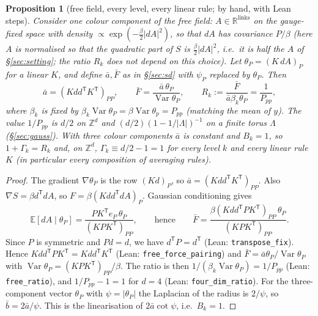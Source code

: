 \documentclass[11pt,a4paper]{article}
\newtheorem{proposition}[theorem]{Proposition}
\theoremstyle{definition}
\theoremstyle{remark}
\newcommand{\E}{\mathbb{E}}
\newcommand{\code}[1]{\texttt{#1}}
\newcommand{\abar}{\bar a}
\newcommand{\bbar}{\bar b}
\newcommand{\Fbar}{\bar F}
\begin{document}
\begin{proposition}[free field, every level, every linear rule; by hand, with Lean steps]\label{prop:free}
Consider one colour component of the free field: $A\in\mathbb R^{\text{links}}$ on the gauge-fixed space with density $\propto\exp(-\tfrac\beta2|dA|^2)$, so that $dA$ has covariance $P/\beta$ (here $A$ is normalised so that the quadratic part of $S$ is $\frac\beta2|dA|^2$, i.e.\ it is half the $A$ of \S\ref{sec:setting}; the ratio $R_k$ does not depend on this choice). Let $\theta_P=(K\,dA)_P$ for a linear $K$, and define $\abar,\Fbar$ as in \S\ref{sec:sd} with $\psi_P$ replaced by $\theta_P$. Then
\[
\abar=(Kdd^{\mathsf T}K^{\mathsf T})_{PP},\qquad \Fbar=\frac{\abar\,\theta_P}{\operatorname{Var}\theta_P},\qquad R_k:=\frac{\Fbar}{\abar\beta_k\theta_P}=\frac1{P_{pp}},
\]
where $\beta_k$ is fixed by $\beta_k\operatorname{Var}\theta_P=\beta\operatorname{Var}\theta_p=P_{pp}$ (matching the mean of $y$). The value $1/P_{pp}$ is $d/2$ on $\mathbb Z^d$ and $(d/2)(1-1/|\Lambda|)^{-1}$ on a finite torus $\Lambda$ (\S\ref{sec:gauss}). With three colour components $\abar$ is constant and $B_k=1$, so $1+\Gamma_k=R_k$ and, on $\mathbb Z^d$, $\Gamma_k\equiv d/2-1=1$ for every level $k$ and every linear rule $K$ (in particular every composition of averaging rules).
\end{proposition}

\begin{proof}
The gradient $\nabla\theta_P$ is the row $(Kd)_P$, so $\abar=(Kdd^{\mathsf T}K^{\mathsf T})_{PP}$. Also $\nabla S=\beta d^{\mathsf T}dA$, so $F=\beta(Kdd^{\mathsf T}dA)_P$. Gaussian conditioning gives
\[
\E[dA\mid\theta_P]=\frac{PK^{\mathsf T}e_P\,\theta_P}{(KPK^{\mathsf T})_{PP}},\qquad\text{hence}\qquad \Fbar=\frac{\beta(Kdd^{\mathsf T}PK^{\mathsf T})_{PP}\,\theta_P}{(KPK^{\mathsf T})_{PP}}.
\] Since $P$ is symmetric and $Pd=d$, we have $d^{\mathsf T}P=d^{\mathsf T}$ (Lean: \code{transpose\_fix}). Hence $Kdd^{\mathsf T}PK^{\mathsf T}=Kdd^{\mathsf T}K^{\mathsf T}$ (Lean: \code{free\_force\_pairing}) and $\Fbar=\abar\theta_P/\operatorname{Var}\theta_P$ with $\operatorname{Var}\theta_P=(KPK^{\mathsf T})_{PP}/\beta$. The ratio is then $1/(\beta_k\operatorname{Var}\theta_P)=1/P_{pp}$ (Lean: \code{free\_ratio}), and $1/P_{pp}-1=1$ for $d=4$ (Lean: \code{four\_dim\_ratio}). For the three-component vector $\theta_P$ with $\psi=|\theta_P|$ the Laplacian of the radius is $2/\psi$, so $\bbar=2\abar/\psi$. This is the linearisation of $2\abar\cot\psi$, i.e.\ $B_k=1$.
\end{proof}
\end{document}
